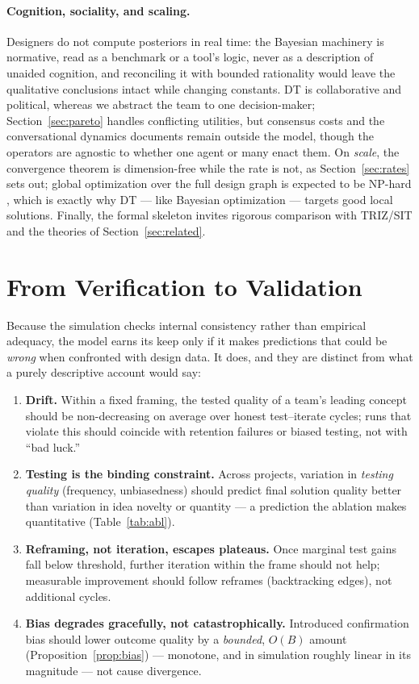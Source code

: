 \documentclass[11pt]{article}
\begin{document}
\paragraph{Cognition, sociality, and scaling.} Designers do not compute posteriors in real time: the Bayesian machinery is normative, read as a benchmark or a tool's logic, never as a description of unaided cognition, and reconciling it with bounded rationality \citep{simon1956} would leave the qualitative conclusions intact while changing constants. DT is collaborative and political, whereas we abstract the team to one decision-maker; Section~\ref{sec:pareto} handles conflicting utilities, but consensus costs and the conversational dynamics \citet{menning2018} documents remain outside the model, though the operators are agnostic to whether one agent or many enact them. On \emph{scale}, the convergence theorem is dimension-free while the rate is not, as Section~\ref{sec:rates} sets out; global optimization over the full design graph is expected to be NP-hard \citep{wikipediaNDb}, which is exactly why DT --- like Bayesian optimization --- targets good local solutions. Finally, the formal skeleton invites rigorous comparison with TRIZ/SIT \citep{altshuller1999} and the theories of Section~\ref{sec:related}.

\section{From Verification to Validation}
\label{sec:validation}\label{sec:roadmap}

Because the simulation checks internal consistency rather than empirical adequacy, the model earns its keep only if it makes predictions that could be \emph{wrong} when confronted with design data. It does, and they are distinct from what a purely descriptive account would say:
\begin{enumerate}
    \item \textbf{Drift.} Within a fixed framing, the tested quality of a team's leading concept should be non-decreasing on average over honest test--iterate cycles; runs that violate this should coincide with retention failures or biased testing, not with ``bad luck.''
    \item \textbf{Testing is the binding constraint.} Across projects, variation in \emph{testing quality} (frequency, unbiasedness) should predict final solution quality better than variation in idea novelty or quantity --- a prediction the ablation makes quantitative (Table~\ref{tab:abl}).
    \item \textbf{Reframing, not iteration, escapes plateaus.} Once marginal test gains fall below threshold, further iteration within the frame should not help; measurable improvement should follow reframes (backtracking edges), not additional cycles.
    \item \textbf{Bias degrades gracefully, not catastrophically.} Introduced confirmation bias should lower outcome quality by a \emph{bounded}, $O(B)$ amount (Proposition~\ref{prop:bias}) --- monotone, and in simulation roughly linear in its magnitude --- not cause divergence.
\end{enumerate}
\end{document}
